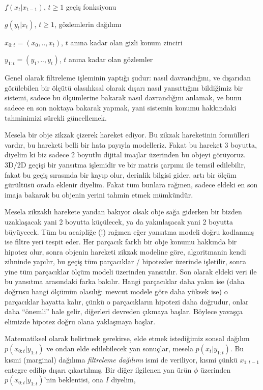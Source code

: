 \documentclass[12pt,fleqn]{article}\usepackage{../../common}
\begin{document}
$f(x_t|x_{t-1})$, $t \ge 1$ geçiş fonksiyonu

$g(y_t|x_t)$, $t \ge 1$, gözlemlerin dağılımı

$x_{0:t} = (x_0,..,x_t)$, $t$ anına kadar olan gizli konum zinciri

$y_{1:t} = (y_1,..,y_t)$, $t$ anına kadar olan gözlemler

Genel olarak filtreleme işleminin yaptığı şudur: nasıl davrandığını, ve
dışarıdan görülebilen bir ölçütü olasılıksal olarak dışarı nasıl yansıttığını
bildiğimiz bir sistemi, sadece bu ölçümlerine bakarak nasıl davrandığını
anlamak, ve bunu sadece en son noktaya bakarak yapmak, yani sistemin konumu
hakkındaki tahminimizi sürekli güncellemek.

Mesela bir obje zikzak çizerek hareket ediyor. Bu zikzak hareketinin formülleri
vardır, bu hareketi belli bir hata payıyla modelleriz. Fakat bu hareket 3
boyutta, diyelim ki biz sadece 2 boyutlu dijital imajlar üzerinden bu objeyi
görüyoruz. 3D/2D geçişi bir yansıtma işlemidir ve bir matris çarpımı ile temsil
edilebilir, fakat bu geçiş sırasında bir kayıp olur, derinlik bilgisi gider,
artı bir ölçüm gürültüsü orada eklenir diyelim. Fakat tüm bunlara rağmen, sadece
eldeki en son imaja bakarak bu objenin yerini tahmin etmek mümkündür.

Mesela zikzaklı harekete yandan bakıyor olsak obje sağa giderken bir bizden
uzaklaşacak yani 2 boyutta küçülecek, ya da yakınlaşacak yani 2 boyutta
büyüyecek. Tüm bu acaipliğe (!) rağmen eğer yansıtma modeli doğru kodlanmış
ise filtre yeri tespit eder. Her parçacık farklı bir obje konumu hakkında
bir hipotez olur, sonra objenin hareketi zikzak modeline göre, algoritmanin
kendi zihninde yapılır, bu geçiş tüm parçacıklar / hipotezler üzerinde
işletilir, sonra yine tüm parçacıklar ölçüm modeli üzerinden
yansıtılır. Son olarak eldeki veri ile bu yansıtma arasındaki farka
bakılır. Hangi parçacıklar daha yakın ise (daha doğrusu hangi ölçümün
olasılığı mevcut modele göre daha yüksek ise) o parçacıklar hayatta kalır,
çünkü o parçacıkların hipotezi daha doğrudur, onlar daha ``önemli'' hale
gelir, diğerleri devreden çıkmaya başlar. Böylece yavaşça elimizde hipotez
doğru olana yaklaşmaya başlar.

Matematiksel olarak belirtmek gerekirse, elde etmek istediğimiz sonsal dağılım
$p(x_{0:t} | y_{1:t})$ ve ondan elde edilebilecek yan sonuçlar, mesela $p(x_t |
y_{1:t})$. Bu kısmi (marginal) dağılıma {\em filtreleme dağılımı} ismi de
veriliyor, kısmi çünkü $x_{1:t-1}$ entegre edilip dışarı çıkartılmış. Bir diğer
ilgilenen yan ürün $\phi$ üzerinden $p(x_{0:t} | y_{1:t})$'nin beklentisi, ona
$I$ diyelim,
\end{document}
